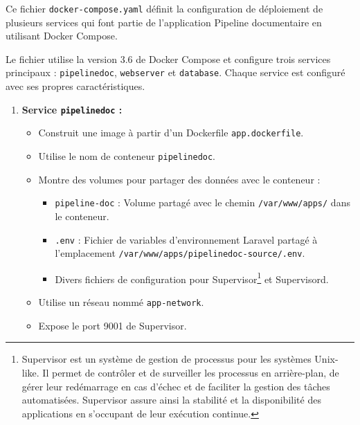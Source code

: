 
Ce fichier \Verb|docker-compose.yaml| définit la configuration de déploiement de plusieurs services qui font partie de l'application Pipeline documentaire en utilisant Docker Compose.

Le fichier utilise la version 3.6 de Docker Compose et configure trois services principaux : \Verb|pipelinedoc|, \Verb|webserver| et \Verb|database|. Chaque service est configuré avec ses propres caractéristiques.

\begin{enumerate}
    \item \cprotect\textbf{Service \Verb|pipelinedoc| :}
          \begin{itemize}
              \item Construit une image à partir d'un Dockerfile \Verb|app.dockerfile|.
              \item Utilise le nom de conteneur \Verb|pipelinedoc|.
              \item Montre des volumes pour partager des données avec le conteneur :
                    \begin{itemize}
                        \item \Verb|pipeline-doc| : Volume partagé avec le chemin \Verb|/var/www/apps/| dans le conteneur.
                        \item \Verb|.env| : Fichier de variables d'environnement Laravel partagé à l'emplacement \Verb|/var/www/apps/pipelinedoc-source/.env|.
                        \item Divers fichiers de configuration pour Supervisor\footnote{Supervisor est un système de gestion de processus pour les systèmes Unix-like. Il permet de contrôler et de surveiller les processus en arrière-plan, de gérer leur redémarrage en cas d'échec et de faciliter la gestion des tâches automatisées. Supervisor assure ainsi la stabilité et la disponibilité des applications en s'occupant de leur exécution continue.} et Supervisord.
                    \end{itemize}
              \item Utilise un réseau nommé \Verb|app-network|.
              \item Expose le port 9001 de Supervisor.

\end{itemize}
\end{enumerate}
